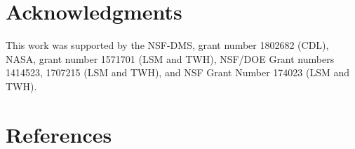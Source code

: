 \documentclass[final,1p,times]{elsarticle}
\theoremstyle{remark}
\theoremstyle{definition}
\newcommand{\josh}[1]{\textcolor{red}{\textbf{#1}}}
\begin{document}
\section*{Acknowledgments}

\noindent This work was supported by the NSF-DMS, grant number 1802682 (CDL), NASA, grant number 1571701 (LSM and TWH), NSF/DOE Grant numbers 1414523, 1707215 (LSM and TWH), and NSF Grant Number 174023 (LSM and TWH). 

\section*{References}













\end{document}

